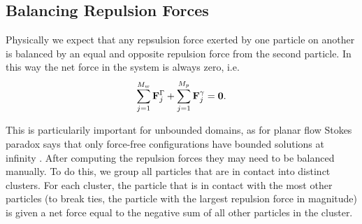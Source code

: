\documentclass[preprint, 10pt]{elsarticle}
\begin{document}
\subsection{Balancing Repulsion Forces}

Physically we expect that any repsulsion force exerted by one particle on another is balanced by an equal and opposite repulsion force from the second particle. In this way the net force in the system is always zero, i.e. 
\begin{equation*}
	\sum\limits_{j=1}^{M_w} {\mathbf{F}}^\Gamma_j + \sum\limits_{j=1}^{M_p}{\mathbf{F}}^\gamma_j = \mathbf{0}.
\end{equation*}

This is particularily important for unbounded domains, as for planar flow Stokes paradox says that only force-free configurations have bounded solutions at infinity \cite{Power1993, Pozrikidis1992}. After computing the repulsion forces they may need to be balanced manually. To do this, we group all particles that are in contact into distinct clusters. For each cluster, the particle that is in contact with the most other particles (to break ties, the particle with the largest repulsion force in magnitude) is given a net force equal to the negative sum of all other particles in the cluster. 
\end{document}
